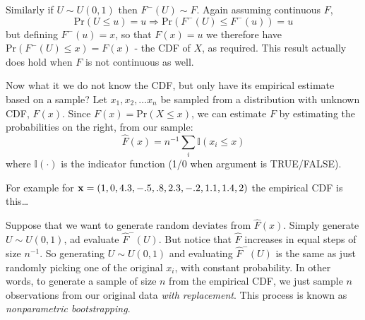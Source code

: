 \documentclass[10pt] {article}
\newcommand{\eps}[3]
{{\begin{center}
 \rotatebox{#1}{\scalebox{#2}{\texttt{[image: \#3]}}}
 \end{center}}
}
\theoremstyle{definition}
\begin{document}
Similarly if $U \sim U(0,1)$ then $F^-(U) \sim F$. Again assuming continuous $F$, 
$$
\text{Pr}(U\le u) = u \Rightarrow \text{Pr}(F^-(U)\le F^-(u)) = u 
$$
but defining $F^-(u) = x$, so that $F(x)=u$ we therefore have $\text{Pr}(F^-(U)\le x) = F(x)$ - the CDF of $X$, as required. This result actually does hold when $F$ is not continuous as well. 

Now what it we do not know the CDF, but only have its empirical estimate based on a sample? Let $x_1, x_2, \ldots x_n$ be sampled from a distribution with unknown CDF, $F(x)$. Since $F(x) = \text{Pr}(X \le x)$, we can estimate $F$ by estimating the probabilities on the right, from our sample:
$$
\hat F(x) = n^{-1} \sum_i \mathbb{I}(x_i\le x)
$$
where $\mathbb{I}(\cdot)$ is the indicator function (1/0 when argument is TRUE/FALSE). 

For example for  ${\bf x} = (1, 0, 4.3, -.5, .8, 2.3, -.2, 1.1, 1.4, 2)$ the empirical CDF is this\ldots

\eps{-90}{.5}{ecdf-bs.eps}

Suppose that we want to generate random deviates from $ \hat F(x) $. Simply generate $U \sim U(0,1)$, ad evaluate $ \hat F^-(U) $. But notice that $\hat F$ increases in equal steps of size $n^{-1}$. So generating $U \sim U(0,1)$ and evaluating $ \hat F^-(U) $ is the same as just randomly picking one of the original $x_i$, with constant probability. In other words, to generate a sample of size $n$ from the empirical CDF, we just sample $n$ observations from our original data {\em with replacement}. This process is known as {\em nonparametric bootstrapping}.    

\begin{lstlisting}

\end{lstlisting}



\printindex
\end{document}
